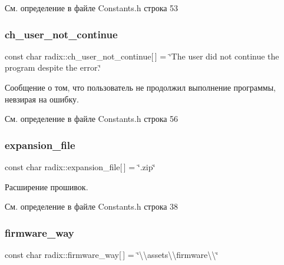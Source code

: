 См. определение в файле Constants.\+h строка 53

\mbox{\label{namespaceradix_afd1855af7805a1bb408ea9175a626ac7}} 
\subsubsection{\texorpdfstring{ch\+\_\+user\+\_\+not\+\_\+continue}{ch\_user\_not\_continue}}
{\footnotesize\ttfamily const char radix\+::ch\+\_\+user\+\_\+not\+\_\+continue\mbox{[}$\,$\mbox{]} = \char`\"{}The user did not continue the program despite the error.\char`\"{}}

Сообщение о том, что пользователь не продолжил выполнение программы, невзирая на ошибку. 

См. определение в файле Constants.\+h строка 56

\mbox{\label{namespaceradix_a01a09f0b88f6fd375ea20667bd318035}} 
\subsubsection{\texorpdfstring{expansion\+\_\+file}{expansion\_file}}
{\footnotesize\ttfamily const char radix\+::expansion\+\_\+file\mbox{[}$\,$\mbox{]} = \char`\"{}.zip\char`\"{}}

Расширение прошивок. 

См. определение в файле Constants.\+h строка 38

\mbox{\label{namespaceradix_a123392a7ece6e11efaf3ad3df291ff3d}} 
\subsubsection{\texorpdfstring{firmware\+\_\+way}{firmware\_way}}
{\footnotesize\ttfamily const char radix\+::firmware\+\_\+way\mbox{[}$\,$\mbox{]} = \char`\"{}\textbackslash{}\textbackslash{}assets\textbackslash{}\textbackslash{}firmware\textbackslash{}\textbackslash{}\char`\"{}}

